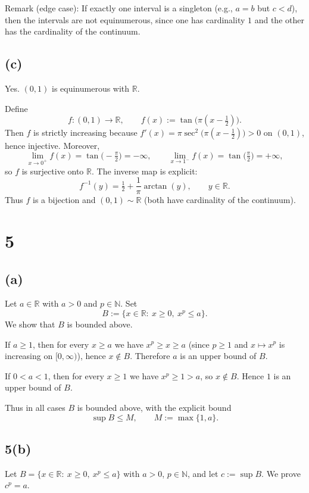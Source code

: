 \documentclass[12pt,a4paper]{article}
\theoremstyle{definition}
\theoremstyle{remark}
\begin{document}
Remark (edge case): If exactly one interval is a singleton (e.g., $a=b$ but $c<d$), then the intervals are not equinumerous, since one has cardinality $1$ and the other has the cardinality of the continuum.


\subsection*{(c)}
Yes. $(0,1)$ is equinumerous with $\mathbb{R}$.

Define
\[
f:(0,1)\longrightarrow\mathbb{R},\qquad f(x):=\tan\!\big(\pi(x-\tfrac12)\big).
\]
Then $f$ is strictly increasing because $f'(x)=\pi\sec^2\!\big(\pi(x-\tfrac12)\big)>0$ on $(0,1)$, hence injective. Moreover,
\[
\lim_{x\to 0^+} f(x)=\tan\!\big(-\tfrac{\pi}{2}\big)=-\infty,
\qquad
\lim_{x\to 1^-} f(x)=\tan\!\big(\tfrac{\pi}{2}\big)=+\infty,
\]
so $f$ is surjective onto $\mathbb{R}$. The inverse map is explicit:
\[
f^{-1}(y)=\tfrac12+\frac{1}{\pi}\arctan(y),\qquad y\in\mathbb{R}.
\]
Thus $f$ is a bijection and $(0,1)\sim\mathbb{R}$ (both have cardinality of the continuum).


\section*{5}
\subsection*{(a)}

Let $a\in\mathbb{R}$ with $a>0$ and $p\in\mathbb{N}$. Set
\[
B:=\{x\in\mathbb{R}:\ x\ge 0,\ x^{p}\le a\}.
\]
We show that $B$ is bounded above.

If $a\ge 1$, then for every $x\ge a$ we have $x^p\ge x\ge a$ (since $p\ge1$ and $x\mapsto x^p$ is increasing on $[0,\infty)$), hence $x\notin B$. Therefore $a$ is an upper bound of $B$.

If $0<a<1$, then for every $x\ge 1$ we have $x^p\ge 1>a$, so $x\notin B$. Hence $1$ is an upper bound of $B$.

Thus in all cases $B$ is bounded above, with the explicit bound
\[
\sup B\le M,\qquad M:=\max\{1,a\}.
\]


\subsection*{5(b)}
Let $B=\{x\in\mathbb{R}:\ x\ge 0,\ x^p\le a\}$ with $a>0$, $p\in\mathbb{N}$, and let $c:=\sup B$. We prove $c^p=a$.
\end{document}
